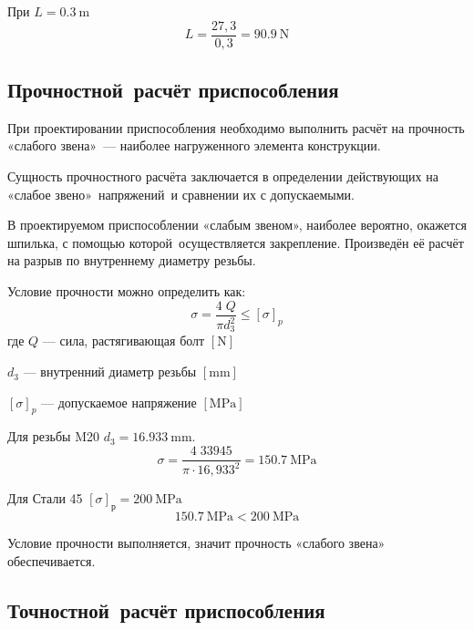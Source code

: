 \documentclass[14pt,russian,a4paper]{extreport}
\begin{document}
При $L = \SI{0,3}{\meter}$
\begin{equation*}
  L = \frac{27,3}{0,3} = \SI{90,9}{\newton}
\end{equation*}

\subsection{Прочностной расчёт приспособления}

При проектировании приспособления необходимо выполнить расчёт на прочность «слабого звена» --- наиболее нагруженного элемента конструкции.

Сущность прочностного расчёта заключается в определении действующих на «слабое звено» напряжений и сравнении их с допускаемыми.

В проектируемом приспособлении «слабым звеном», наиболее вероятно, окажется шпилька, с помощью которой осуществляется закрепление. Произведён её расчёт на разрыв по внутреннему диаметру резьбы.

Условие прочности можно определить как: \cite[форм.~14.6]{ryahovskiy:dm}
\begin{equation*}
  \sigma = \frac{4 \; Q}{\pi d_3^2} \leq \left[ \sigma \right]_p
\end{equation*}
где $Q$ --- сила, растягивающая болт $\left[\si{\newton}\right]$ \par
$d_3$ --- внутренний диаметр резьбы $\left[\si{\milli\meter}\right]$ \par
$\left[ \sigma \right]_p$ --- допускаемое напряжение $\left[\si{\mega\pascal}\right]$

Для резьбы M20 $ d_3 = \SI{16,933}{\milli\meter} $.
\begin{equation*}
  \sigma = \frac{4 \; 33945}{\pi \cdot 16,933^2} = \SI{150,7}{\mega\pascal}
\end{equation*}

Для Стали 45 $ \left[\sigma\right]_\text{р} = \SI{200}{\mega\pascal} $
\begin{equation*}
  \SI{150,7}{\mega\pascal} < \SI{200}{\mega\pascal}
\end{equation*}

Условие прочности выполняется, значит прочность «слабого звена» обеспечивается.

\subsection{Точностной расчёт приспособления}



\nocite{malvyat:okp}

\nocite{burtsev:tm2}
\nocite{bezyazichny:otm}
\nocite{blumenstejn:pto}
\nocite{kosilova:stm2}
\nocite{tarabarin:pto}
\nocite{gost:14-205-83}
\nocite{gost:3-1118-88}
\nocite{gost:2-105-95}
\nocite{gost:3-1702-79}

\printbibliography[heading=none]
\end{document}
